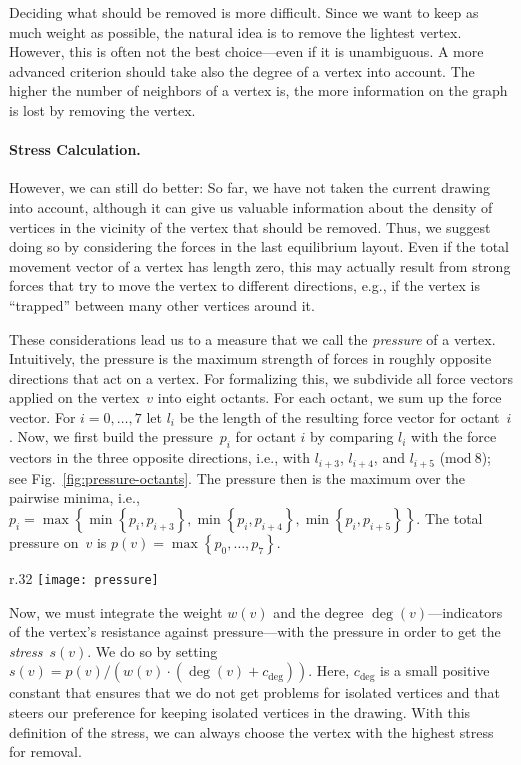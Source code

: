 \documentclass[]{llncs}
\newcommand{\cdeg}{\ensuremath{c_{\deg}}\xspace}
\begin{document}
Deciding what should be removed is more difficult. Since we
want to keep as much weight as possible, the natural idea is to
remove the lightest vertex. However, this is often not the best
choice---even if it is unambiguous. A more advanced
criterion should take also the degree of a vertex into account. The
higher the number of neighbors of a vertex is, the more information on
the graph is lost by removing the vertex.


\paragraph{Stress Calculation.}
However, we can still do better: So far, we have not taken the current
drawing into account, although it can give us valuable information
about the density of vertices in the vicinity of the vertex that
should be removed. Thus, we suggest doing so by considering the forces
in the last equilibrium layout. Even if the total movement vector of a
vertex has length zero, this may actually result from strong forces
that try to move the vertex to different directions, e.g., if the
vertex is ``trapped'' between many other vertices around it.

These considerations lead us to a measure that we call the
\emph{pressure} of a vertex. Intuitively, the pressure is the maximum
strength of forces in roughly opposite directions that act on a
vertex. For formalizing this, we subdivide all force vectors applied
on the vertex~$v$ into eight octants. For each
octant, we sum up the force vector. For $i=0, \ldots, 7$ let
$l_i$ be the length of the resulting force vector for octant~$i$.
Now, we first build the pressure~$p_i$ for octant $i$ by comparing $l_i$ with
the force vectors in the three opposite directions, i.e., with
$l_{i+3}$, $l_{i+4}$, and $l_{i+5}$ ($\mathrm{mod}~8$); see
Fig.~\ref{fig:pressure-octants}.
The pressure then is
the maximum over the pairwise minima, i.e., $p_i = \max \left\{
  \min\left\{ p_i, p_{i+3} \right\}, \min\left\{ p_i, p_{i+4}
\right\}, \min\left\{ p_i, p_{i+5} \right\} \right\}$. The total
pressure on~$v$ is $p(v) = \max \left\{ p_0, \ldots, p_7 \right\}$.

\begin{wrapfigure}[12]{r}{.32\textwidth}
	\centering
	\texttt{[image: pressure]}
	\caption{Pressure computation for one of the octants.}
	\label{fig:pressure-octants}
\end{wrapfigure}
Now, we must integrate the weight $w(v)$ and the degree
$\deg(v)$---indicators of the vertex's resistance against
pressure---with the pressure in order to get the \emph{stress}~$s(v)$.
We do so by setting $s(v) = p(v)/(w(v) \cdot (\deg(v) +
\cdeg ))$. Here, \cdeg is a small positive constant that ensures that
we do not get problems for isolated vertices and that steers our preference
for keeping isolated vertices in the drawing. With this definition of the stress, we
can always choose the vertex with the highest stress for removal.
\end{document}
